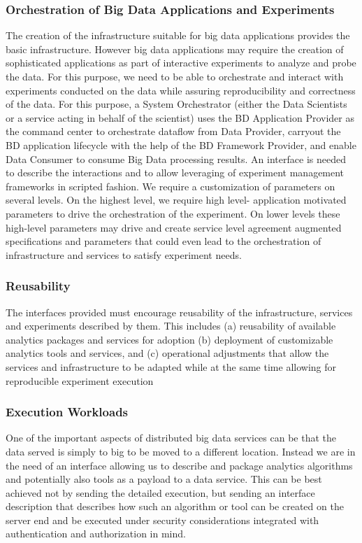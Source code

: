 \documentclass[10pt]{article}
\begin{document}
\subsubsection{Orchestration of Big Data Applications and Experiments}

The creation of the infrastructure suitable for big data applications provides the basic infrastructure. However big data applications may require the creation of sophisticated applications as part of interactive experiments to analyze and probe the data. For this purpose, we need to be able to orchestrate and interact with experiments conducted on the data while assuring reproducibility and correctness of the data. For this purpose, a System Orchestrator (either the Data Scientists or a service acting in behalf of the scientist) uses the BD Application Provider as the command center to orchestrate dataflow from Data Provider, carryout the BD application lifecycle with the help of the BD Framework Provider, and enable Data Consumer to consume Big Data processing results. An interface is needed to describe the interactions and to allow leveraging of experiment management frameworks in scripted fashion. We require a customization of parameters on several levels. On the highest level, we require high level- application motivated parameters to drive the orchestration of the experiment. On lower levels these high-level parameters may drive and create service level agreement augmented specifications and parameters that could even lead to the orchestration of infrastructure and services to satisfy experiment needs.

\subsubsection{Reusability}

The interfaces provided must encourage reusability of the infrastructure, services and experiments described by them. This includes (a) reusability of available analytics packages and services for adoption (b) deployment of customizable analytics tools and services, and (c) operational adjustments that allow the services and infrastructure to be adapted while at the same time allowing for reproducible experiment execution

\subsubsection{Execution Workloads}

One of the important aspects of distributed big data services can be that the data served is simply to big to be moved to a different location. Instead we are in the need of an interface allowing us to describe and package analytics algorithms and potentially also tools as a payload to a data service. This can be best achieved not by sending the detailed execution, but sending an interface description that describes how such an algorithm or tool can be created on the server end and be executed under security considerations integrated with authentication and authorization in mind.
\end{document}
